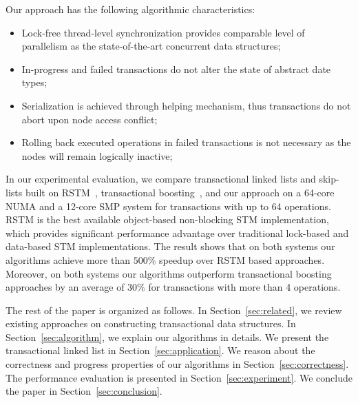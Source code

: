 \documentclass[10pt,conference,compsocconf]{IEEEtran}
\begin{document}
Our approach has the following algorithmic characteristics:
\begin{itemize}
    \item Lock-free thread-level synchronization provides comparable level of parallelism as the state-of-the-art concurrent data structures;
    \item In-progress and failed transactions do not alter the state of abstract date types;
    \item Serialization is achieved through helping mechanism, thus transactions do not abort upon node access conflict; 
    \item Rolling back executed operations in failed transactions is not necessary as the nodes will remain logically inactive;
\end{itemize}

In our experimental evaluation, we compare transactional linked lists and skip-lists built on RSTM~\cite{marathe2006lowering}, transactional boosting~\cite{herlihy2008transactional}, and our approach on a 64-core NUMA and a 12-core SMP system for transactions with up to 64 operations.
RSTM is the best available object-based non-blocking STM implementation, which provides significant performance advantage over traditional lock-based and data-based STM implementations.
The result shows that on both systems our algorithms achieve more than $500\%$ speedup over RSTM based approaches.
Moreover, on both systems our algorithms outperform transactional boosting approaches by an average of $30\%$ for transactions with more than 4 operations.

The rest of the paper is organized as follows. 
In Section~\ref{sec:related}, we review existing approaches on constructing transactional data structures.
In Section~\ref{sec:algorithm}, we explain our algorithms in details.
We present the transactional linked list in Section~\ref{sec:application}.
We reason about the correctness and progress properties of our algorithms in Section~\ref{sec:correctness}.
The performance evaluation is presented in Section~\ref{sec:experiment}.
We conclude the paper in Section~\ref{sec:conclusion}.
\end{document}
